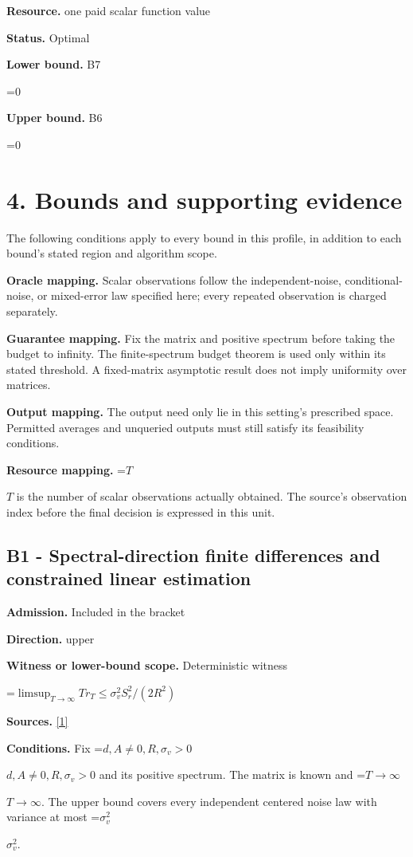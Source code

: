 \documentclass[10pt,a4paper]{article}
\newcommand{\AtlasMath}[1]{\par\begingroup\centering\setbox0=\hbox{$\displaystyle #1$}\ifdim\wd0>1.4\linewidth\typeout{ATLAS WIDE FORMULA: \the\wd0}\fi\ifdim\wd0>\linewidth\resizebox{\linewidth}{!}{\box0}\else\box0\fi\par\endgroup}
\newcommand{\AtlasInlineMath}[1]{\begingroup\setbox0=\hbox{$#1$}\ifdim\wd0>.4\linewidth\endgroup\AtlasMath{#1}\else\endgroup$#1$\fi}
\begin{document}
\textbf{Resource.} one paid scalar function value

\textbf{Status.} Optimal

\textbf{Lower bound.} B7

\AtlasMath{0}
\textbf{Upper bound.} B6

\AtlasMath{0}
\section{4. Bounds and supporting evidence}
The following conditions apply to every bound in this profile, in addition to each bound's stated region and algorithm scope.

\textbf{Oracle mapping.} Scalar observations follow the independent-noise, conditional-noise, or mixed-error law specified here; every repeated observation is charged separately.

\textbf{Guarantee mapping.} Fix the matrix and positive spectrum before taking the budget to infinity. The finite-spectrum budget theorem is used only within its stated threshold. A fixed-matrix asymptotic result does not imply uniformity over matrices.

\textbf{Output mapping.} The output need only lie in this setting's prescribed space. Permitted averages and unqueried outputs must still satisfy its feasibility conditions.

\textbf{Resource mapping.} \AtlasInlineMath{T} is the number of scalar observations actually obtained. The source's observation index before the final decision is expressed in this unit.

\subsection{B1 - Spectral-direction finite differences and constrained linear estimation}
\textbf{Admission.} Included in the bracket

\textbf{Direction.} upper

\textbf{Witness or lower-bound scope.} Deterministic witness

\AtlasMath{\limsup_{T\to\infty}T r_T\le\sigma_v^2 S_r^2/(2R^2)}
\textbf{Sources.} \href{https://proceedings.neurips.cc/paper_files/paper/2023/file/6e60a9023d2c63f7f0856910129ae753-Paper-Conference.pdf}{[1]}

\textbf{Conditions.} Fix \AtlasInlineMath{d,A\ne0,R,\sigma_v>0} and its positive spectrum. The matrix is known and \AtlasInlineMath{T\to\infty}. The upper bound covers every independent centered noise law with variance at most \AtlasInlineMath{\sigma_v^2}.
\end{document}
